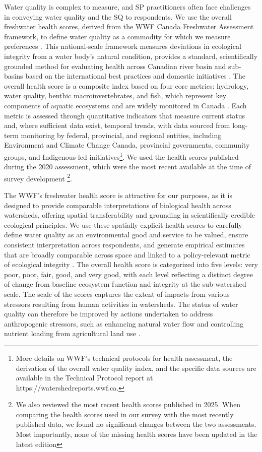 \documentclass[12pt]{article}
\begin{document}
Water quality is complex to measure, and SP practitioners often face challenges in conveying water quality and the 
SQ to respondents. We use the overall freshwater health scores, derived from the WWF Canada Freshwater 
Assessment framework, to define water quality as a commodity for which we measure preferences \parencite{WWF2020}. 
This national-scale framework measures deviations in ecological integrity from a water body’s natural condition, 
provides a standard, scientifically grounded method for evaluating health across Canadian river basin and sub-basins 
based on the international best practices \parencite{boulton1999overview,Roux1999,Norris1999,Birk2012,USEPA2013} and 
domestic initiatives \parencite{Kidd2011,Alberta2012,Maaskant2012}. The overall health score is a composite 
index based on four core metrics: hydrology, water quality, benthic macroinvertebrates, 
and fish, which represent key components of aquatic ecosystems and are widely monitored in Canada \parencite{WWF2020}. 
Each metric is assessed through quantitative indicators that measure current status and, where sufficient data exist, 
temporal trends, with data sourced from long-term monitoring by federal, provincial, and regional entities, including 
Environment and Climate Change Canada, provincial governments, community groups, and Indigenous-led 
initiatives\footnote{More details on WWF's technical protocols for health assessment, the derivation of the overall 
water quality index, and the specific data sources are available in the Technical Protocol report at https://watershedreports.wwf.ca.}. 
We used the health scores published during the 2020 assessment, which were the most recent available at the time of survey development
\footnote{We also reviewed the most recent health scores published in 2025. When comparing the health scores used in our survey with the most 
recently published data, we found no significant changes between the two assessments. Most importantly, none of the 
missing health scores have been updated in the latest edition}.


The WWF's freshwater health score is attractive for our purposes, as it is designed to provide comparable interpretations of 
biological health across watersheds, offering spatial transferability and grounding in scientifically credible ecological 
principles. We use these spatially explicit health scores to carefully define water quality as an environmental good and 
service to be valued, ensure consistent interpretation across respondents, and generate empirical estimates that are broadly 
comparable across space and linked to a policy-relevant metric of ecological integrity \parencite{vossler2023valuing}. The 
overall health score is categorized into five levels: very poor, poor, fair, good, and very good, with each level reflecting a 
distinct degree of change from baseline ecosystem function and integrity at the sub-watershed scale. The scale of the scores 
captures the extent of impacts from various stressors resulting from human activities in watersheds. The status of water quality 
can therefore be improved by actions undertaken to address anthropogenic stressors, such as enhancing natural water flow and 
controlling nutrient loading from agricultural land use \parencite{chambers2012development,vossler2023valuing}.
\end{document}

